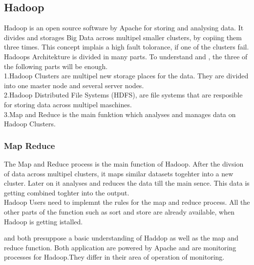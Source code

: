 \subsection{Hadoop}
\label{subsec:Hadoop}
Hadoop is an open source software by Apache for storing and analysing data. It divides and storages Big Data across multipel smaller clusters, by copiing them three times. This concept implais a high fault tolorance, if one of the clusters fail.
 \\
 Hadoops Architekture is divided in many parts. To understand \amb and \chuk, the three of the following parts will be enough.
  \\
  1.Hadoop Clusters are multipel new storage places for the data. They are divided into one master node and several server nodes.
  \\
  2.Hadoop Distributed File Systems (HDFS), are file systems that are resposible for storing data across multipel maschines.
  \\
  3.Map and Reduce is the main funktion which analyses and manages data on Hadoop Clusters.
\subsubsection*{Map Reduce}
The Map and Reduce process is the main function of Hadoop. After the divsion of data across multipel clusters, it maps similar datasets togehter into a new cluster. Later on it analyses and reduces the data till the main sence. This data is getting combined toghter into the output. 
\\
Hadoop Users need to implemnt the rules for the map and reduce process. All the other parts of the function such as sort and store are already available, when Hadoop is getting istalled.


\amb and \chuk both presuppose a basic understanding of Haddop as well as the map and reduce function. Both application are powered by Apache and are monitoring processes for Hadoop.They differ in their area of operation of monitoring. 